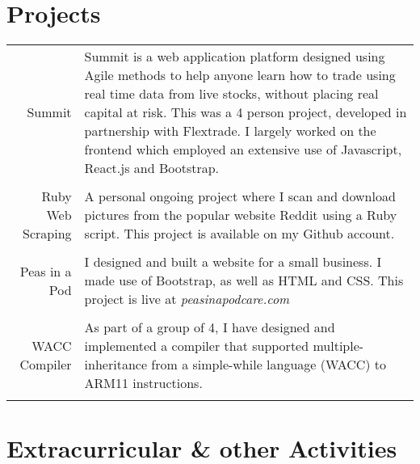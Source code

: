 \documentclass[a4paper,10pt]{article}
\begin{document}
	\section*{Projects}
	
	\begin{tabular}{r|p{12cm}}
		
		Summit  & Summit is a web application platform designed using Agile methods to help anyone learn how to trade using real time data from live stocks, without placing real capital at risk. This was a 4 person project, developed in partnership with Flextrade. I largely worked on the frontend which employed an extensive use of Javascript, React.js and Bootstrap.
		\\\multicolumn{2}{c}{} \\
		
		Ruby Web Scraping & A personal ongoing project where I scan and download pictures from the popular website Reddit using a Ruby script. This project is available on my Github account.
		\\\multicolumn{2}{c}{} \\
		
		Peas in a Pod & I designed and built a website for a small business. I made use of Bootstrap, as well as HTML and CSS. This project is live at \textit{peasinapodcare.com}
		 \\\multicolumn{2}{c}{} \\
		 
		WACC Compiler & As part of a group of 4, I have designed and implemented a compiler that supported multiple-inheritance from a simple-while language (WACC) to ARM11 instructions. 
		\\\multicolumn{2}{c}{} \\
		
	\end{tabular}
	
	\section*{Extracurricular \& other Activities}
	
\end{document}
